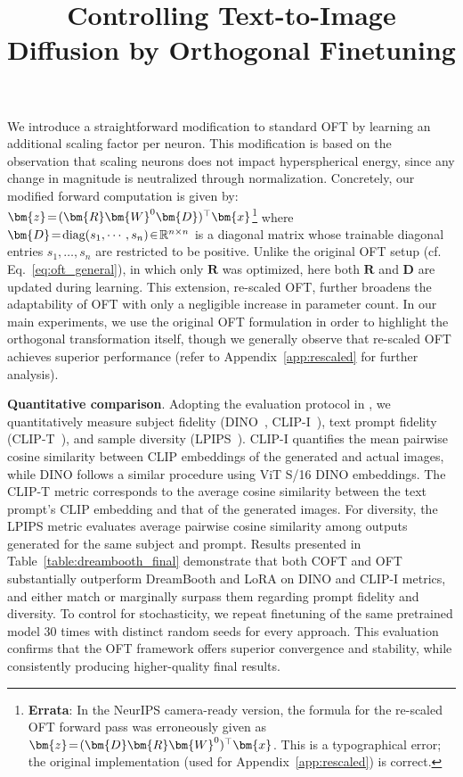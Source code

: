\title{Controlling Text-to-Image Diffusion by Orthogonal Finetuning}
We introduce a straightforward modification to standard OFT by learning an additional scaling factor per neuron. This modification is based on the observation that scaling neurons does not impact hyperspherical energy, since any change in magnitude is neutralized through normalization. Concretely, our modified forward computation is given by: $\thickmuskip=2mu \medmuskip=2mu\bm{z}=(\bm{R}\bm{W}^0\bm{D})^\top\bm{x}$\footnote{\textbf{Errata}: In the NeurIPS camera-ready version, the formula for the re-scaled OFT forward pass was erroneously given as $\thickmuskip=2mu \medmuskip=2mu\bm{z}=(\bm{D}\bm{R}\bm{W}^0)^\top\bm{x}$. This is a typographical error; the original implementation (used for Appendix~\ref{app:rescaled}) is correct.} where $\thickmuskip=2mu \medmuskip=2mu \bm{D}=\text{diag}(s_1,\cdots,s_n)\in\mathbb{R}^{n\times n}$ is a diagonal matrix whose trainable diagonal entries $s_1,\dots,s_n$ are restricted to be positive. Unlike the original OFT setup (cf. Eq.~\eqref{eq:oft_general}), in which only $\bm{R}$ was optimized, here both $\bm{R}$ and $\bm{D}$ are updated during learning. This extension, re-scaled OFT, further broadens the adaptability of OFT with only a negligible increase in parameter count. In our main experiments, we use the original OFT formulation in order to highlight the orthogonal transformation itself, though we generally observe that re-scaled OFT achieves superior performance (refer to Appendix~\ref{app:rescaled} for further analysis).

\textbf{Quantitative comparison}. Adopting the evaluation protocol in \cite{ruiz2023dreambooth}, we quantitatively measure subject fidelity (DINO~\cite{caron2021emerging}, CLIP-I~\cite{radford2021learning}), text prompt fidelity (CLIP-T~\cite{radford2021learning}), and sample diversity (LPIPS~\cite{zhang2018unreasonable}). CLIP-I quantifies the mean pairwise cosine similarity between CLIP embeddings of the generated and actual images, while DINO follows a similar procedure using ViT S/16 DINO embeddings. The CLIP-T metric corresponds to the average cosine similarity between the text prompt’s CLIP embedding and that of the generated images. For diversity, the LPIPS metric evaluates average pairwise cosine similarity among outputs generated for the same subject and prompt. Results presented in Table~\ref{table:dreambooth_final} demonstrate that both COFT and OFT substantially outperform DreamBooth and LoRA on DINO and CLIP-I metrics, and either match or marginally surpass them regarding prompt fidelity and diversity. To control for stochasticity, we repeat finetuning of the same pretrained model 30 times with distinct random seeds for every approach. This evaluation confirms that the OFT framework offers superior convergence and stability, while consistently producing higher-quality final results.

